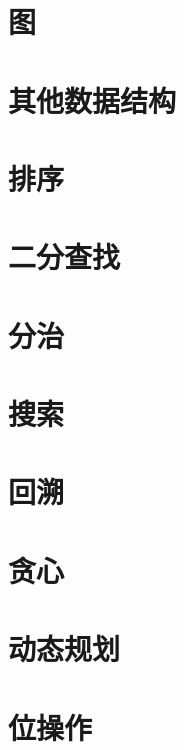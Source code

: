 \documentclass[oneside]{book}
\begin{document}
\begin{CJK}{UTF8}{gbsn}
\chapter{图}


\chapter{其他数据结构}


\chapter{排序}


\chapter{二分查找}


\chapter{分治}


\chapter{搜索}


\chapter{回溯}


\chapter{贪心}


\chapter{动态规划}


\chapter{位操作}


%

\end{CJK}
\end{document}
